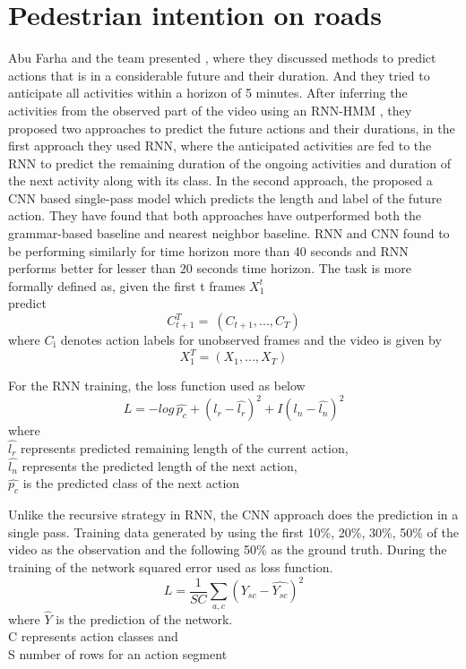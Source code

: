 \section{Pedestrian intention on roads}
\newpara Abu Farha and the team presented \cite{abu2018will}, where they discussed methods to predict actions that is in a considerable future and their duration. And they tried to anticipate all activities within a horizon of 5 minutes. After inferring the activities from the observed part of the video using an RNN-HMM \cite{richard2017weakly}, they proposed two approaches to predict the future actions and their durations, in the first approach they used RNN, where the anticipated activities are fed to the RNN to predict the remaining duration of the ongoing activities and duration of the next activity along with its class.
In the second approach, the proposed a CNN based single-pass model which predicts the length and label of the future action. They have found that both approaches have outperformed both the grammar-based baseline and nearest neighbor baseline. RNN and CNN found to be performing similarly for time horizon more than 40 seconds and RNN performs better for lesser than 20 seconds time horizon. The task is more formally defined as,
given the first t frames $X_{\text{1}}^t$ \\
predict \[ C_{t+1}^T  = \ (C_{t+1}, ..., C_{T}) \]
where $C_{\text{i}}$ denotes action labels for unobserved frames
and the video is given by
\[ X_{1}^T = (X_{1}, ..., X_{T}) \]

\newpara
For the RNN training, the loss function used as below
\begin{equation}
    L = -log\, \hat{p_c} + (l_r - \hat{l_r})^2 +  I (l_n - \hat{l_n})^2 
\end{equation}
where \\
$\hat{l_r}$ represents predicted remaining length of the current action, \\
$\hat{l_n}$ represents the predicted length of the next action, \\
$\hat{p_c}$ is the predicted class of the next action

\newpara Unlike the recursive strategy in RNN, the CNN approach does the prediction in a single pass.
Training data generated by using the first 10\%, 20\%, 30\%, 50\% of the video as the observation and the following 50\% as the ground truth. During the training of the network squared error used as loss function.
\begin{equation}
    L = \frac{1} {SC} \sum_{a,c} (Y_{sc} - \hat{Y_{sc}})^2 
\end{equation}
where $\hat{Y}$ is the prediction of the network. \\
C represents action classes and \\
S number of rows for an action segment

